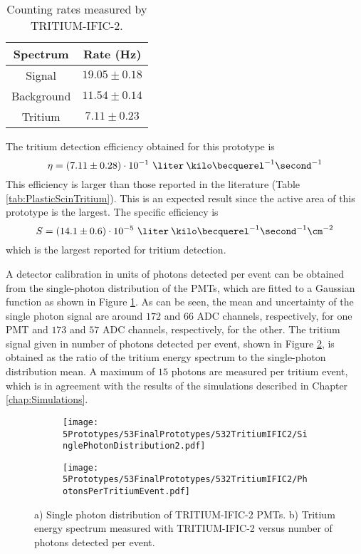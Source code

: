 \begin{table}[htbp]
\centering{}%
\begin{tabular}{cc}
\toprule 
Spectrum & Rate (Hz) \tabularnewline
\midrule
\midrule 
Signal & $19.05 \pm 0.18$ \tabularnewline
Background & $11.54 \pm 0.14$ \tabularnewline  
Tritium & $7.11 \pm 0.23$ \tabularnewline
\bottomrule
\end{tabular}
\caption{Counting rates measured by TRITIUM-IFIC-2.}
\label{tab:CountsPerSecondTRITIUMIFIC2}
\end{table}
The tritium detection efficiency obtained for this prototype is $$\eta = (7.11 \pm 0.28)\cdot{} 10^{-1}~\liter\:\kilo\becquerel^{-1}\second^{-1}$$ 
This efficiency is larger than those reported in the literature (Table \ref{tab:PlasticScinTritium}). This is an expected result since the active area of this prototype is the largest. The specific efficiency is
$$S=(14.1 \pm 0.6)\cdot{} 10^{-5}~\liter\:\kilo\becquerel^{-1}\second^{-1}\cm^{-2}$$
which is the largest reported for tritium detection. 

A detector calibration in units of photons detected per event can be obtained from the single-photon distribution of the PMTs, which are fitted to a Gaussian function as shown in Figure \ref{subfig:SinglePhotonDistributionIFIC2}. As can be seen, the mean and uncertainty of the single photon signal are around $172$ and $66$ ADC channels, respectively, for one PMT and $173$ and $57$ ADC channels, respectively, for the other. The tritium signal given in number of photons detected per event, shown in Figure \ref{subfig:TritiumSignalTRITIUMIFIC2}, is obtained as the ratio of the tritium energy spectrum to the single-photon distribution mean. A maximum of $15$ photons are measured per tritium event, which is in agreement with the results of the simulations described in Chapter \ref{chap:Simulations}. 

\begin{figure}
\centering
    \begin{subfigure}[b]{0.9\textwidth}
    \centering
    \texttt{[image: 5Prototypes/53FinalPrototypes/532TritiumIFIC2/SinglePhotonDistribution2.pdf]}  
    \caption{\label{subfig:SinglePhotonDistributionIFIC2}}
    \end{subfigure}
    \hfill
    \begin{subfigure}[b]{0.9\textwidth}
    \centering
    \texttt{[image: 5Prototypes/53FinalPrototypes/532TritiumIFIC2/PhotonsPerTritiumEvent.pdf]}  
    \caption{\label{subfig:TritiumSignalTRITIUMIFIC2}}
    \end{subfigure}
 \caption{a) Single photon distribution of TRITIUM-IFIC-2 PMTs. b) Tritium energy spectrum measured with TRITIUM-IFIC-2 versus number of photons detected per event.}
 \label{fig:PhotonsPerTritiumEventIFIC2}
\end{figure}

